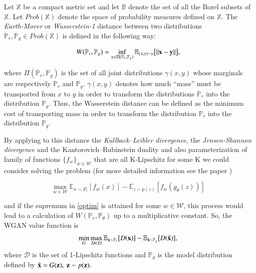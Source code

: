 Let $\mathbb{X}$ be a compact metric set and let $\mathbb{B}$ denote the set of all the Borel subsets of $\mathbb{X}$. Let $Prob(\mathbb{X})$ denote the space of probability measures defined on $\mathbb{X}$. The \emph{Earth-Mover} or \emph{Wasserstein-1} distance between two distributions $\mathbb{P}_r, \mathbb{P}_g \in Prob(\mathbb{X})$ is defined in the following way:

\begin{equation}\label{wasserstein_metric}
W(\mathbb{P}_r, \mathbb{P}_g) = \inf_{\gamma \in \Pi(\mathbb{P}_r, \mathbb{P}_g)} \mathbb{E}_{(x, y) \sim \gamma} \big{[}\|\mathbf{x}-\textbf{y}\|\big{]},
\end{equation}

where $\Pi(\mathbb{P}_r, \mathbb{P}_g)$ is the set of all joint distributions $\gamma(x, y)$ whose marginals are respectively $\mathbb{P}_r$ and $\mathbb{P}_g$. $\gamma(x, y)$ denotes how much “mass” must be transported from $x$ to $y$ in order to transform the distributions $\mathbb{P}_r$ into the distribution $\mathbb{P}_g$. Thus, the Wasserstein distance can be defined as the minimum cost of transporting mass in order to transform the distribution $\mathbb{P}_r$ into the distribution $\mathbb{P}_q$. 

By applying to this distance the \emph{Kullback--Leibler divergence}, the \emph{Jensen-Shannon divergence} and the Kantorovich--Rubinstein duality and also parameterization of family of functions $\{f_w\}_{w \in \mathcal{W}}$ that are all K-Lipschitz for some K we could consider solving the problem (for more detailed information see the paper \cite{arjovsky2017wasserstein})

\begin{equation}\label{optim}
\max_{w \in \mathcal{W}} \mathbb{E}_{x \sim P_r}[f_w(x)] - \mathbb{E}_{z\sim p(z)} [f_w(g_\theta(z))]
\end{equation}

and if the supremum in \eqref{optim} is attained for some $w \in \mathcal{W}$, this process would lead to a calculation of $W(\mathbb{P}_r, \mathbb{P}_\theta)$ up to a multiplicative constant.
So, the WGAN value function is
\begin{equation}\label{wgan_loss}
\min_G \max_{D \in \mathcal{D}}  \mathbb{E}_{\mathbf{x} \sim \mathbb{P}_r}  [D(\mathbf{x})] - \mathbb{E}_{\tilde{\mathbf{x}} \sim \mathbb{P}_g} [D(\tilde{\mathbf{x}})],
\end{equation}
where $\mathcal{D}$ is the set of 1-Lipschitz functions and $\mathbb{P}_g$ is  the model distribution defined by $\tilde{\mathbf{x}} = G(\mathbf{z}), ~\mathbf{z} \sim p(\mathbf{z}).$


